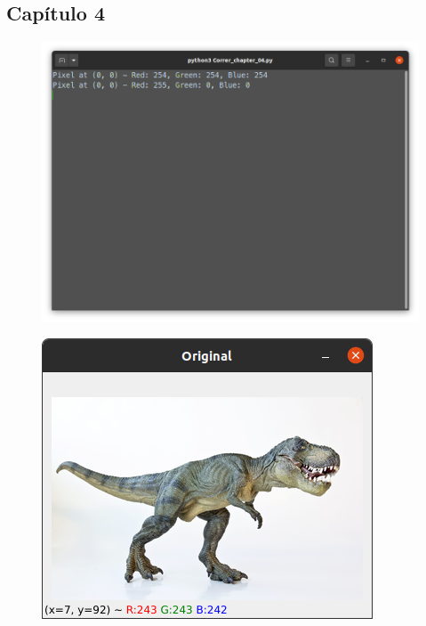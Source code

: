 \documentclass[12pt,letterpaper]{article}
\begin{document}
\begin{multicols}{2}

\section{Capítulo 4}

\begin{figure}[H]
\centering
\includegraphics[width = \columnwidth]{Terminal_ch4.png}
\end{figure}

\begin{figure}[H]
\centering
\includegraphics[width = \columnwidth]{Resultado1_ch4.png}
\end{figure}


\end{multicols}
\end{document}
